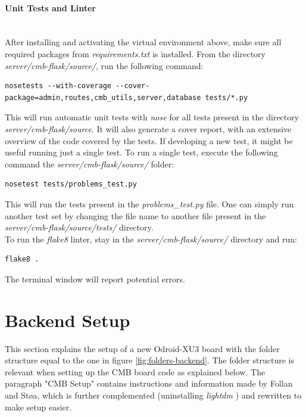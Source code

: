 \paragraph*{Unit Tests and Linter} \hfill \\
After installing and activating the virtual environment above, make sure all required packages from \textit{requirements.txt} is installed. From the directory \textit{server/cmb-flask/source/}, run the following command:
\begin{lstlisting}
nosetests --with-coverage --cover-package=admin,routes,cmb_utils,server,database tests/*.py
\end{lstlisting}
This will run automatic unit tests with \textit{nose} \cite{m:nose} for all tests present in the directory \textit{server/cmb-flask/source}. It will also generate a cover report, with an extensive overview of the code covered by the tests. If developing a new test, it might be useful running just a single test. To run a single test, execute the following command the \textit{server/cmb-flask/source/} folder:
\begin{lstlisting}
nosetest tests/problems_test.py
\end{lstlisting}
This will run the tests present in the \textit{problems\_test.py} file. One can simply run another test set by changing the file name to another file present in the \textit{server/cmb-flask/source/tests/} directory. \\
\noindent
To run the \textit{flake8} linter, stay in the \textit{server/cmb-flask/source/} directory and run:
\begin{lstlisting}
flake8 .
\end{lstlisting}
The terminal window will report potential errors.

\section{Backend Setup}
\label{sec:bsetup}
This section explains the setup of a new Odroid-XU3 board with the folder structure equal to the one in figure \ref{fig:folders-backend}. The folder structure is relevant when setting up the CMB board code as explained below. The paragraph "CMB Setup" contains instructions and information made by Follan and Støa, which is further complemented (uninstalling \textit{lightdm} \cite{m:lightdm}) and rewritten to make setup easier.

